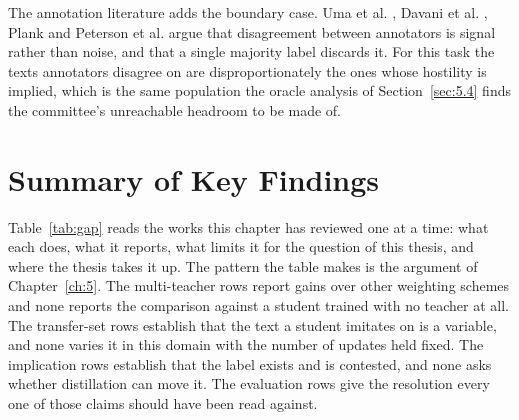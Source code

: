 The annotation literature adds the boundary case. Uma et al. \cite{uma2021learning}, Davani et al.
\cite{davani2022dealing}, Plank \cite{plank2022problem} and Peterson et al. \cite{peterson2019human}
argue that disagreement between annotators is signal rather than noise, and that a single majority label
discards it. For this task the texts annotators disagree on are disproportionately the ones whose
hostility is implied, which is the same population the oracle analysis of Section~\ref{sec:5.4} finds
the committee's unreachable headroom to be made of.


\section{Summary of Key Findings}
\label{sec:gap}
Table~\ref{tab:gap} reads the works this chapter has reviewed one at a time: what each does, what it
reports, what limits it for the question of this thesis, and where the thesis takes it up. The pattern
the table makes is the argument of Chapter~\ref{ch:5}. The multi-teacher rows report gains over other
weighting schemes and none reports the comparison against a student trained with no teacher at all. The
transfer-set rows establish that the text a student imitates on is a variable, and none varies it in
this domain with the number of updates held fixed. The implication rows establish that the label exists
and is contested, and none asks whether distillation can move it. The evaluation rows give the
resolution every one of those claims should have been read against.

